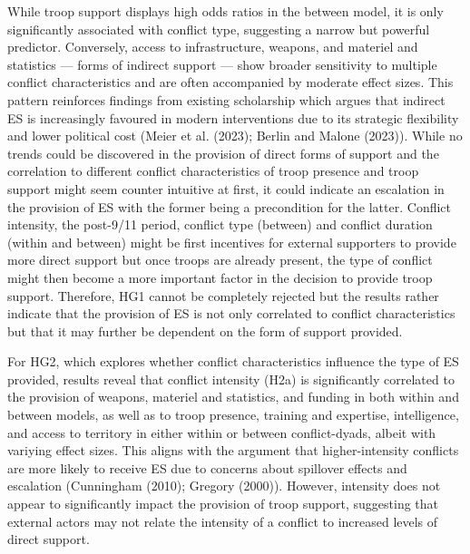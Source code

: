 \documentclass[
]{article}
\begin{document}
While troop support displays high odds ratios in the between model, it
is only significantly associated with conflict type, suggesting a narrow
but powerful predictor. Conversely, access to infrastructure, weapons,
and materiel and statistics --- forms of indirect support --- show
broader sensitivity to multiple conflict characteristics and are often
accompanied by moderate effect sizes. This pattern reinforces findings
from existing scholarship which argues that indirect ES is increasingly
favoured in modern interventions due to its strategic flexibility and
lower political cost (Meier et al. (2023); Berlin and Malone (2023)).
While no trends could be discovered in the provision of direct forms of
support and the correlation to different conflict characteristics of
troop presence and troop support might seem counter intuitive at first,
it could indicate an escalation in the provision of ES with the former
being a precondition for the latter. Conflict intensity, the post-9/11
period, conflict type (between) and conflict duration (within and
between) might be first incentives for external supporters to provide
more direct support but once troops are already present, the type of
conflict might then become a more important factor in the decision to
provide troop support. Therefore, HG1 cannot be completely rejected but
the results rather indicate that the provision of ES is not only
correlated to conflict characteristics but that it may further be
dependent on the form of support provided.

For HG2, which explores whether conflict characteristics influence the
type of ES provided, results reveal that conflict intensity (H2a) is
significantly correlated to the provision of weapons, materiel and
statistics, and funding in both within and between models, as well as to
troop presence, training and expertise, intelligence, and access to
territory in either within or between conflict-dyads, albeit with
variying effect sizes. This aligns with the argument that
higher-intensity conflicts are more likely to receive ES due to concerns
about spillover effects and escalation (Cunningham (2010); Gregory
(2000)). However, intensity does not appear to significantly impact the
provision of troop support, suggesting that external actors may not
relate the intensity of a conflict to increased levels of direct
support.
\end{document}
